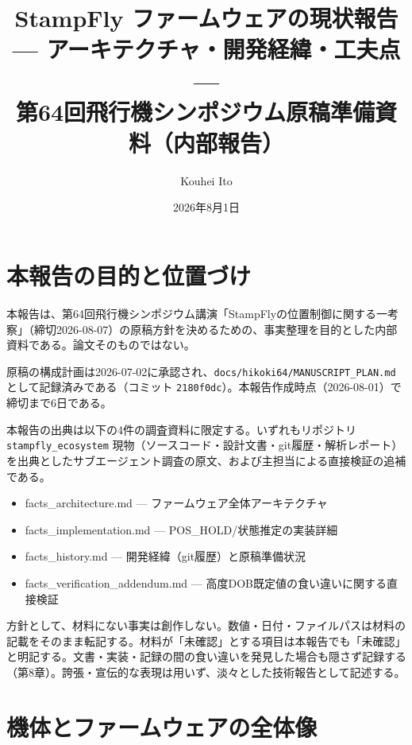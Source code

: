 \documentclass[a4paper,10pt]{ltjsarticle}
\title{\Large StampFly ファームウェアの現状報告\\[2mm]
\normalsize --- アーキテクチャ・開発経緯・工夫点 ---\\[4mm]
\large 第64回飛行機シンポジウム原稿準備資料（内部報告）}
\author{Kouhei Ito}
\date{2026年8月1日}
\begin{document}
\maketitle

\tableofcontents

\section{本報告の目的と位置づけ}

本報告は、第64回飛行機シンポジウム講演「StampFlyの位置制御に関する一考察」（締切2026-08-07）の原稿方針を決めるための、事実整理を目的とした内部資料である。論文そのものではない。

原稿の構成計画は2026-07-02に承認され、\texttt{docs/hikoki64/MANUSCRIPT\_PLAN.md} として記録済みである（コミット \texttt{2180f0dc}）。本報告作成時点（2026-08-01）で締切まで6日である。

本報告の出典は以下の4件の調査資料に限定する。いずれもリポジトリ \texttt{stampfly\_ecosystem} 現物（ソースコード・設計文書・git履歴・解析レポート）を出典としたサブエージェント調査の原文、および主担当による直接検証の追補である。

\begin{itemize}[leftmargin=*]
  \item facts\_architecture.md --- ファームウェア全体アーキテクチャ
  \item facts\_implementation.md --- POS\_HOLD/状態推定の実装詳細
  \item facts\_history.md --- 開発経緯（git履歴）と原稿準備状況
  \item facts\_verification\_addendum.md --- 高度DOB既定値の食い違いに関する直接検証
\end{itemize}

方針として、材料にない事実は創作しない。数値・日付・ファイルパスは材料の記載をそのまま転記する。材料が「未確認」とする項目は本報告でも「未確認」と明記する。文書・実装・記録の間の食い違いを発見した場合も隠さず記録する（第8章）。誇張・宣伝的な表現は用いず、淡々とした技術報告として記述する。

\section{機体とファームウェアの全体像}
\end{document}
